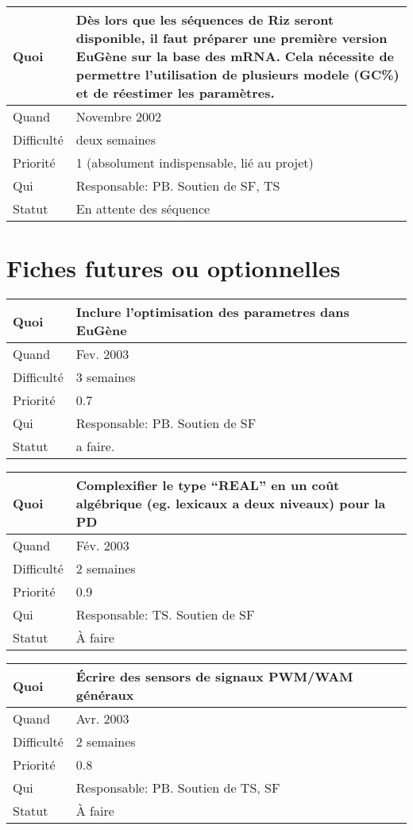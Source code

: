 \documentclass[a4paper,11pt]{article}
\begin{document}
\begin{longtable}{|l|p{7cm}|}\hline
  Quoi & D\`es lors que les s\'equences de Riz seront disponible, il faut
  pr\'eparer une premi\`ere version EuG\`ene sur la base des mRNA. Cela
  n{\'e}cessite de permettre l'utilisation de plusieurs modele (GC\%)
  et de r\'eestimer les param\`etres.\\\hline
  Quand  & Novembre 2002 \\\hline
  Difficult\'e & deux semaines \\\hline
  Priorit\'e & 1 (absolument indispensable, li\'e au projet) \\\hline
  Qui & Responsable: PB. Soutien de SF, TS\\\hline
  Statut & En attente des s\'equence\\\hline
\end{longtable}

\section{Fiches futures ou optionnelles}

\begin{longtable}{|l|p{7cm}|}\hline
  Quoi & Inclure l'optimisation des parametres dans EuG\`ene\\\hline
  Quand  &  Fev. 2003\\\hline
  Difficult\'e & 3 semaines \\\hline
  Priorit\'e & 0.7\\\hline
  Qui & Responsable: PB. Soutien de SF\\\hline
  Statut & a faire.\\\hline
\end{longtable}

\begin{longtable}{|l|p{7cm}|}\hline
  Quoi & Complexifier le type ``REAL'' en un co\^ut alg\'ebrique
  (eg. lexicaux a deux niveaux) pour la PD\\\hline
  Quand  & F\'ev. 2003 \\\hline
  Difficult\'e &  2 semaines\\\hline
  Priorit\'e &  0.9\\\hline
  Qui & Responsable: TS. Soutien de SF\\\hline
  Statut & \`A faire\\\hline
\end{longtable}


\begin{longtable}{|l|p{7cm}|}\hline
  Quoi & \'Ecrire des sensors de signaux PWM/WAM g\'en\'eraux\\\hline
  Quand  &  Avr. 2003\\\hline
  Difficult\'e &  2 semaines\\\hline
  Priorit\'e &  0.8 \\\hline
  Qui & Responsable: PB. Soutien de TS, SF\\\hline
  Statut & \`A faire\\\hline
\end{longtable}
\end{document}
